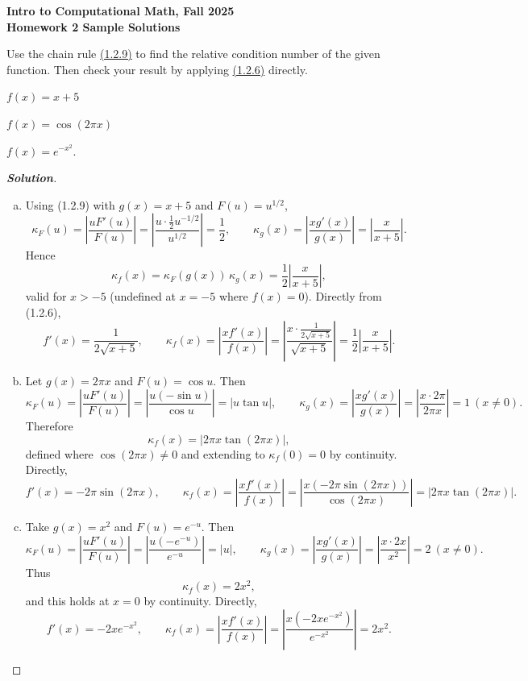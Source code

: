 \documentclass[11pt]{article}
\newenvironment{problem}[2][Question]{\begin{trivlist}
\item[\hskip \labelsep {\bfseries #1}\hskip \labelsep {\bfseries #2.}]}{\end{trivlist}}
\newenvironment{solution}{%
  \begin{proof}[\textbf{Solution}]$ $\par\nobreak\ignorespaces
}{%
  \end{proof}
}
\theoremstyle{definition}
\begin{document}
\begin{center}
{\bf Intro to Computational Math, Fall 2025\\
Homework 2 Sample Solutions}
\end{center}

\begin{problem}{1}
Use the chain rule \href{https://fncbook.com/conditioning/#condition-chain}{(1.2.9)} to find the relative condition number of the given function. Then check your result by applying \href{https://fncbook.com/conditioning/#conditionderiv}{(1.2.6)} directly.
\begin{enumerate*}[(a),itemjoin=\qquad]
    \item $f(x) = x +5$
    \item $f(x) = \cos(2\pi x)$
    \item $f(x) = e^{-x^2}$.
\end{enumerate*}
\end{problem}
\begin{solution}
\begin{enumerate}[(a)]
    \item Using (1.2.9) with $g(x)=x+5$ and $F(u)=u^{1/2}$,
    \[
    \kappa_{F}(u)=\left|\frac{u F'(u)}{F(u)}\right|=\left|\frac{u \cdot \frac12 u^{-1/2}}{u^{1/2}}\right|=\frac12,\qquad
    \kappa_{g}(x)=\left|\frac{x g'(x)}{g(x)}\right|=\left|\frac{x}{x+5}\right|.
    \]
    Hence
    \[
    \kappa_{f}(x)=\kappa_{F}(g(x))\,\kappa_{g}(x)=\frac12\left|\frac{x}{x+5}\right|,
    \]
    valid for $x>-5$ (undefined at $x=-5$ where $f(x)=0$). Directly from (1.2.6),
    \[
    f'(x)=\frac{1}{2\sqrt{x+5}},\qquad
    \kappa_{f}(x)=\left|\frac{x f'(x)}{f(x)}\right|
    =\left|\frac{x \cdot \frac{1}{2\sqrt{x+5}}}{\sqrt{x+5}}\right|
    =\frac12\left|\frac{x}{x+5}\right|.
    \]
    \item Let $g(x)=2\pi x$ and $F(u)=\cos u$. Then
    \[
    \kappa_{F}(u)=\left|\frac{u F'(u)}{F(u)}\right|=\left|\frac{u (-\sin u)}{\cos u}\right|=\left|u \tan u\right|,\qquad
    \kappa_{g}(x)=\left|\frac{x g'(x)}{g(x)}\right|=\left|\frac{x \cdot 2\pi}{2\pi x}\right|=1\ (x\ne 0).
    \]
    Therefore
    \[
    \kappa_{f}(x)=\left|2\pi x \tan(2\pi x)\right|,
    \]
    defined where $\cos(2\pi x)\ne 0$ and extending to $\kappa_f(0)=0$ by continuity. Directly,
    \[
    f'(x)=-2\pi \sin(2\pi x),\qquad
    \kappa_{f}(x)=\left|\frac{x f'(x)}{f(x)}\right|
    =\left|\frac{x (-2\pi \sin(2\pi x))}{\cos(2\pi x)}\right|
    =\left|2\pi x \tan(2\pi x)\right|.
    \]
    \item Take $g(x)=x^2$ and $F(u)=e^{-u}$. Then
    \[
    \kappa_{F}(u)=\left|\frac{u F'(u)}{F(u)}\right|=\left|\frac{u (-e^{-u})}{e^{-u}}\right|=|u|,\qquad
    \kappa_{g}(x)=\left|\frac{x g'(x)}{g(x)}\right|=\left|\frac{x \cdot 2x}{x^2}\right|=2\ (x\ne 0).
    \]
    Thus
    \[
    \kappa_{f}(x)=2 x^2,
    \]
    and this holds at $x=0$ by continuity. Directly,
    \[
    f'(x)=-2x e^{-x^2},\qquad
    \kappa_{f}(x)=\left|\frac{x f'(x)}{f(x)}\right|
    =\left|\frac{x (-2x e^{-x^2})}{e^{-x^2}}\right|
    =2 x^2.
    \]
\end{enumerate}
\end{solution}
\end{document}
